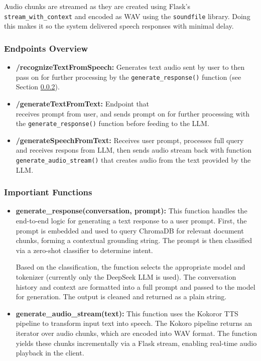 \documentclass[twocolumn]{article}
\begin{document}
Audio chunks are streamed as they are created using Flask's \texttt{stream\_with\_context} and encoded as WAV using the \texttt{soundfile}\cite{soundfile} library. Doing this makes it so the system delivered speech responses with minimal delay.

\subsubsection{Endpoints Overview}
\begin{itemize}
    \item \textbf{/recognizeTextFromSpeech:} Generates text audio sent by user to then pass on for further processing by the \texttt{generate\_response()} function (see Section \ref{sec:functions}).
    \item \textbf{/generateTextFromText:} Endpoint that\\ receives prompt from user, and sends prompt on for further processing with the \texttt{generate\_response()} function before feeding to the LLM.
    \item \textbf{/generateSpeechFromText:} Receives user prompt, processes full query and receives respons from LLM, then sends audio stream back with function \texttt{generate\_audio\_stream()} that creates audio from the text provided by the LLM.
\end{itemize}
\subsubsection{Importiant Functions}
\label{sec:functions}
\begin{itemize}
    \item \textbf{generate\_response(conversation, prompt):} This function handles the end-to-end logic for generating a text response to a user prompt. First, the prompt is embedded and used to query ChromaDB for relevant document chunks, forming a contextual grounding string. The prompt is then classified via a zero-shot classifier to determine intent.

    Based on the classification, the function selects the appropriate model and tokenizer (currently only the DeepSeek LLM is used). The conversation history and context are formatted into a full prompt and passed to the model for generation. The output is cleaned and returned as a plain string.
    \item \textbf{generate\_audio\_stream(text):} This function uses the Kokoror TTS pipeline to transform input text into speech. The Kokoro pipeline returns an iterator over audio chunks, which are encoded into WAV format. The function yields these chunks incrementally via a Flask stream, enabling real-time audio playback in the client.
\end{itemize}
\end{document}
